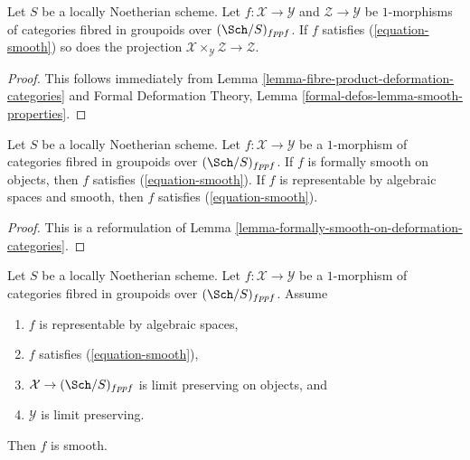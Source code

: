 \begin{lemma}
\label{lemma-base-change-smooth}
Let $S$ be a locally Noetherian scheme. Let $f : \mathcal{X} \to \mathcal{Y}$
and $\mathcal{Z} \to \mathcal{Y}$ be $1$-morphisms of
categories fibred in groupoids over $(\Sch/S)_{fppf}$. If $f$
satisfies (\ref{equation-smooth}) so does the projection
$\mathcal{X} \times_\mathcal{Y} \mathcal{Z} \to \mathcal{Z}$.
\end{lemma}

\begin{proof}
This follows immediately from
Lemma \ref{lemma-fibre-product-deformation-categories}
and
Formal Deformation Theory, Lemma
\ref{formal-defos-lemma-smooth-properties}.
\end{proof}

\begin{lemma}
\label{lemma-smooth-smooth}
Let $S$ be a locally Noetherian scheme. Let $f : \mathcal{X} \to \mathcal{Y}$
be a $1$-morphism of categories fibred in groupoids over $(\Sch/S)_{fppf}$.
If $f$ is formally smooth on objects, then $f$ satisfies
(\ref{equation-smooth}). If $f$ is representable by algebraic spaces
and smooth, then $f$ satisfies (\ref{equation-smooth}).
\end{lemma}

\begin{proof}
This is a reformulation of Lemma \ref{lemma-formally-smooth-on-deformation-categories}.
\end{proof}

\begin{lemma}
\label{lemma-implies-smooth}
Let $S$ be a locally Noetherian scheme. Let $f : \mathcal{X} \to \mathcal{Y}$
be a $1$-morphism of categories fibred in groupoids over $(\Sch/S)_{fppf}$.
Assume
\begin{enumerate}
\item $f$ is representable by algebraic spaces,
\item $f$ satisfies (\ref{equation-smooth}),
\item $\mathcal{X} \to (\Sch/S)_{fppf}$ is limit preserving on objects, and
\item $\mathcal{Y}$ is limit preserving.
\end{enumerate}
Then $f$ is smooth.
\end{lemma}

